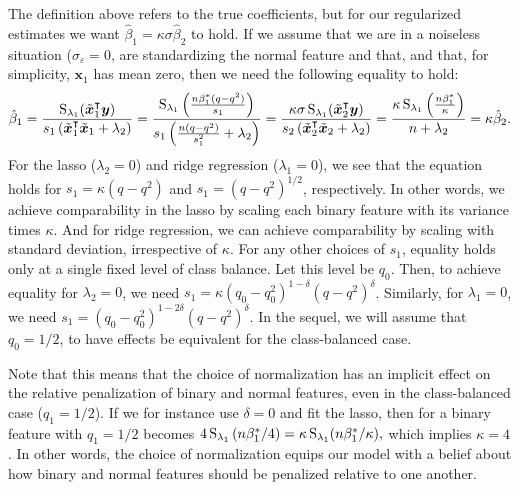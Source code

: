 The definition above refers to the true coefficients, but for our regularized estimates we
want \(\hat{\beta}_1 = \kappa\sigma\hat{\beta}_2\) to hold. If we assume that we are in a
noiseless situation (\(\sigma_\varepsilon = 0\), are standardizing the normal feature and
that, and that, for simplicity, \(\bm{x}_1\) has mean zero, then we need the following
equality to hold:
%
\begin{equation}
  \label{eq:comparable-effects}
  \hat{\beta}_1 = \frac{\operatorname{S}_{\lambda_1}(\tilde{\boldsymbol{x}}_1^\intercal \boldsymbol{y})}{s_1\left(\tilde{\boldsymbol{x}}_1^\intercal \tilde{\boldsymbol{x}}_1 + \lambda_2\right)}
  = \frac{\operatorname{S}_{\lambda_1}\left(\frac{n\beta_1^* (q - q^2)}{s_1}\right)}{s_1\left(\frac{n(q - q^2)}{s_1^2} + \lambda_2\right)}
  = \frac{\kappa\sigma \operatorname{S}_{\lambda_1}(\tilde{\boldsymbol{x}}_2^\intercal \boldsymbol{y})}{s_2\left(\tilde{\boldsymbol{x}}_2^\intercal \tilde{\boldsymbol{x}}_2 + \lambda_2\right)}
  = \frac{\kappa \operatorname{S}_{\lambda_1}\left(\frac{n\beta_1^*}{\kappa} \right)}{n + \lambda_2}
  = \kappa \hat{\beta}_2.
\end{equation}
%
For the lasso (\(\lambda_2 = 0\)) and ridge regression (\(\lambda_1=0\)), we see that the
equation holds for \(s_1 = \kappa (q - q^2)\) and \(s_1 = (q - q^2)^{1/2}\), respectively.
In other words, we achieve comparability in the lasso by scaling each binary feature with
its variance times \(\kappa\). And for ridge regression, we can achieve comparability by
scaling with standard deviation, irrespective of \(\kappa\). For any other choices of
\(s_1\), equality holds only at a single fixed level of class balance. Let this level be
\(q_0\). Then, to achieve equality for \(\lambda_2 = 0\), we need \(s_1 =\kappa (q_0 -
q_0^2)^{1 - \delta}(q - q^2)^\delta\). Similarly, for \(\lambda_1 = 0\), we need \(s_1 =
(q_0 - q_0^2)^{1 - 2\delta} (q - q^2)^\delta\). In the sequel, we will assume that \(q_0 =
1/2\), to have effects be equivalent for the class-balanced case.

Note that this means that the choice of normalization has an implicit effect on the
relative penalization of binary and normal features, even in the class-balanced case (\(q_1
= 1/2\)). If we for instance use \(\delta=0\) and fit the lasso, then
 for a binary feature with \(q_1=1/2\) becomes
\(4\operatorname{S}_{\lambda_1}\left(n\beta_1^*/4\right) = \kappa \operatorname{S}_{\lambda_1}(n\beta_1^*/\kappa ),\)
which implies \(\kappa = 4\). In other words, the choice of normalization equips our model
with a belief about how binary and normal features should be penalized relative to one
another.


